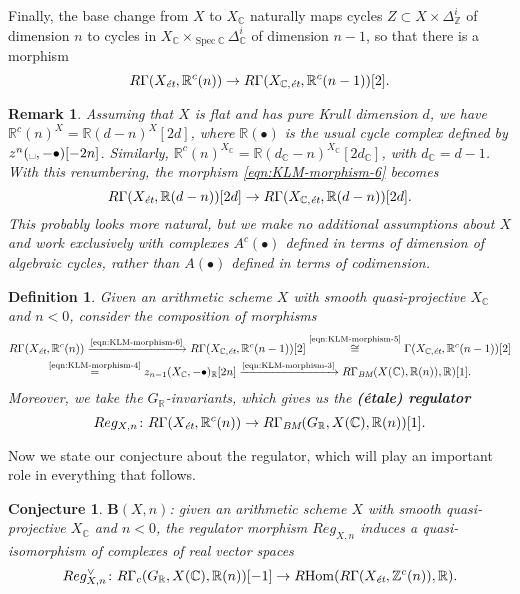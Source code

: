 \documentclass[10pt,a4paper,oneside,draft]{article}
\DeclareMathOperator{\Hom}{Hom}
\DeclareMathOperator{\Spec}{Spec}
\newcommand{\CC}{\mathbb{C}}
\newcommand{\RR}{\mathbb{R}}
\newcommand{\ZZ}{\mathbb{Z}}
\newcommand{\BM}{\text{\it BM}}
\newcommand{\et}{\text{\it \'{e}t}}
\newcommand{\RHom}{R\!\Hom}
\theoremstyle{myplain}
\theoremstyle{mydefinition}
\newtheorem{definition}[theorem]{Definition}
\newtheorem{conjecture}[theorem]{Conjecture}
\newtheorem{remark}[theorem]{Remark}
\numberwithin{equation}{section}
\begin{document}
Finally, the base change from $X$ to $X_\CC$ naturally maps cycles
$Z \subset X \times \Delta_\ZZ^i$ of dimension $n$ to cycles in
$X_\CC \times_{\Spec \CC} \Delta_\CC^i$ of dimension $n-1$, so that there is a
morphism
\begin{equation}
  \label{eqn:KLM-morphism-6}
  R\Gamma (X_\et, \RR^c (n)) \to R\Gamma (X_{\CC,\et}, \RR^c (n-1)) [2].
\end{equation}

\begin{remark}
  Assuming that $X$ is flat and has pure Krull dimension $d$, we have
  $\RR^c (n)^X = \RR (d-n)^X [2d]$, where $\RR (\bullet)$ is the usual cycle
  complex defined by $z^n (\text{\textvisiblespace}, -\bullet) [-2n]$.
  Similarly, $\RR^c (n)^{X_\CC} = \RR (d_\CC-n)^{X_\CC} [2d_\CC]$, with
  $d_\CC = d - 1$. With this renumbering, the morphism
  \eqref{eqn:KLM-morphism-6} becomes
  $$R\Gamma (X_\et, \RR (d-n)) [2d] \to R\Gamma (X_{\CC,\et}, \RR (d-n)) [2d].$$
  This probably looks more natural, but we make no additional assumptions about
  $X$ and work exclusively with complexes $A^c (\bullet)$ defined in terms of
  dimension of algebraic cycles, rather than $A (\bullet)$ defined in terms of
  codimension.
\end{remark}

\begin{definition}
  Given an arithmetic scheme $X$ with smooth quasi-projective $X_\CC$ and
  $n < 0$, consider the composition of morphisms
  \begin{multline*}
    R\Gamma (X_\et, \RR^c (n)) \xrightarrow{\text{\eqref{eqn:KLM-morphism-6}}}
    R\Gamma (X_{\CC,\et}, \RR^c (n-1)) [2] \stackrel{\text{\eqref{eqn:KLM-morphism-5}}}{\cong}
    \Gamma (X_{\CC,\et}, \RR^c (n-1)) [2] \\
    \stackrel{\text{\eqref{eqn:KLM-morphism-4}}}{=}
    z_{n-1} (X_\CC, -\bullet)_\RR [2n] \xrightarrow{\text{\eqref{eqn:KLM-morphism-3}}}
    R\Gamma_\BM (X (\CC), \RR (n)), \RR) [1].
  \end{multline*}
  Moreover, we take the $G_\RR$-invariants, which gives us the
  \textbf{(\'{e}tale) regulator}
  \[ Reg_{X,n}\colon R\Gamma (X_\et, \RR^c (n)) \to
    R\Gamma_\BM (G_\RR, X(\CC), \RR (n)) [1]. \]
\end{definition}

Now we state our conjecture about the regulator, which will play an important
role in everything that follows.

\begin{conjecture}
  $\mathbf{B} (X,n)$: given an arithmetic scheme $X$ with smooth
  quasi-projective $X_\CC$ and $n < 0$, the regulator morphism $Reg_{X,n}$
  induces a quasi-isomorphism of complexes of real vector spaces
  \[ Reg_{X,n}^\vee\colon R\Gamma_c (G_\RR, X (\CC), \RR (n)) [-1] \to
    \RHom (R\Gamma (X_\et, \ZZ^c (n)), \RR). \]
\end{conjecture}
\end{document}
